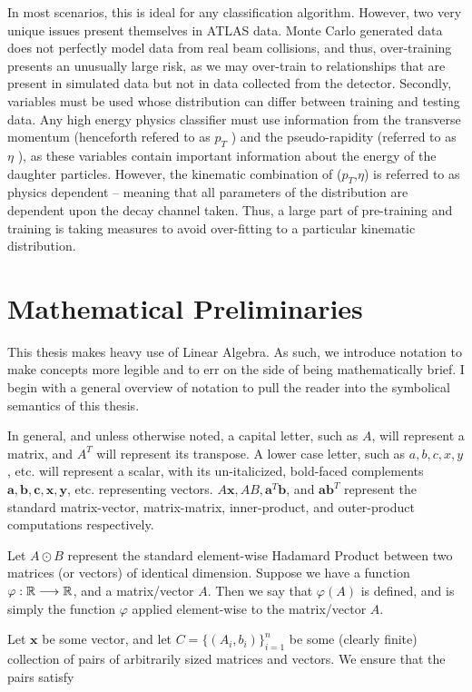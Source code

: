 In most scenarios, this is ideal for any classification algorithm. However, two very unique issues present themselves in ATLAS data. Monte Carlo generated data does not perfectly model data from real beam collisions, and thus, over-training presents an unusually large risk, as we may over-train to relationships that are present in simulated data but not in data collected from the detector. Secondly, variables must be used whose distribution can differ between training and testing data. Any high energy physics classifier must use information from the transverse momentum (henceforth refered to as $p_{T}$
 ) and the pseudo-rapidity (referred to as $\eta$
 ), as these variables contain important information about the energy of the daughter particles. However, the kinematic combination of ($p_{T}$,$\eta$)
  is referred to as physics dependent -- meaning that all parameters of the distribution are dependent upon the decay channel taken. Thus, a large part of pre-training and training is taking measures to avoid over-fitting to a particular kinematic distribution.
  
\section{Mathematical Preliminaries}
This thesis makes heavy use of Linear Algebra. As such, we introduce notation to make concepts more legible and to err on the side of being mathematically brief. I begin with a general overview of notation to pull the reader into the symbolical semantics of this thesis. 

In general, and unless otherwise noted, a capital letter, such as $A$, will represent a matrix, and $A^T$ will represent its transpose. A lower case letter, such as $a,b,c,x,y$, etc. will represent a scalar, with its un-italicized, bold-faced complements $\mathbf{a},\mathbf{b},\mathbf{c},\mathbf{x},\mathbf{y}$, etc. representing vectors. $A\mathbf{x}, AB, \mathbf{a}^T \mathbf{b}$, and $\mathbf{a} \mathbf{b}^T$ represent the standard matrix-vector, matrix-matrix, inner-product, and outer-product computations respectively.

Let $A\odot B$ represent the standard element-wise Hadamard Product between two matrices (or vectors) of identical dimension. Suppose we have a function $\varphi : \mathbb{R} \longrightarrow \mathbb{R}$, and a matrix/vector $A$. Then we say that $\varphi(A)$ is defined, and is simply the function $\varphi$ applied element-wise to the matrix/vector $A$.

Let $\mathbf{x}$ be some vector, and let $C=\{ (A_i,b_i) \}_{i=1}^{n}$ be some (clearly finite) collection of pairs of arbitrarily sized matrices and vectors. We ensure that the pairs satisfy

